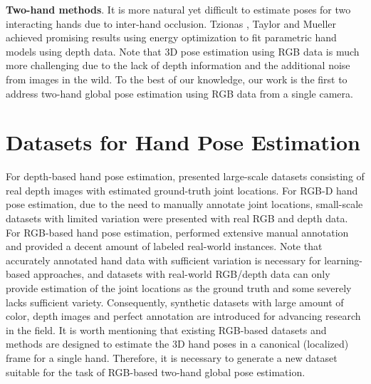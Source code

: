 \documentclass[10pt,twocolumn,letterpaper]{article}
\begin{document}
\noindent\textbf{Two-hand methods}. It is more natural yet difficult to estimate poses for two interacting hands due to inter-hand occlusion. Tzionas \etal \cite{Tzionas}, Taylor \etal \cite{Taylor} and Mueller \etal \cite{Mueller3} achieved promising results using energy optimization to fit parametric hand models using depth data. Note that 3D pose estimation using RGB data is much more challenging due to the lack of depth information and the additional noise from images in the wild. To the best of our knowledge, our work is the first to address two-hand global pose estimation using RGB data from a single camera.
\section{Datasets for Hand Pose Estimation}
\indent For depth-based hand pose estimation, \cite{Tompson,Tang,Sun,Yuan,Garcia} presented large-scale datasets consisting of real depth images with estimated ground-truth joint locations. For RGB-D hand pose estimation, due to the need to manually annotate joint locations, small-scale datasets \cite{Mueller2,Sridhar3,Zhang} with limited variation were presented with real RGB and depth data. For RGB-based hand pose estimation, \cite{Simon, Zimmermann2} performed extensive manual annotation and provided a decent amount of labeled real-world instances. Note that accurately annotated hand data with sufficient variation is necessary for learning-based approaches, and datasets with real-world RGB/depth data can only provide estimation of the joint locations as the ground truth and some severely lacks sufficient variety. Consequently, synthetic datasets \cite{Mueller,Mueller2,Zimmermann} with large amount of color, depth images and perfect annotation are introduced for advancing research in the field. It is worth mentioning that existing RGB-based datasets and methods are designed to estimate the 3D hand poses in a canonical (localized) frame for a single hand. Therefore, it is necessary to generate a new dataset suitable for the task of RGB-based two-hand global pose estimation.
\end{document}
